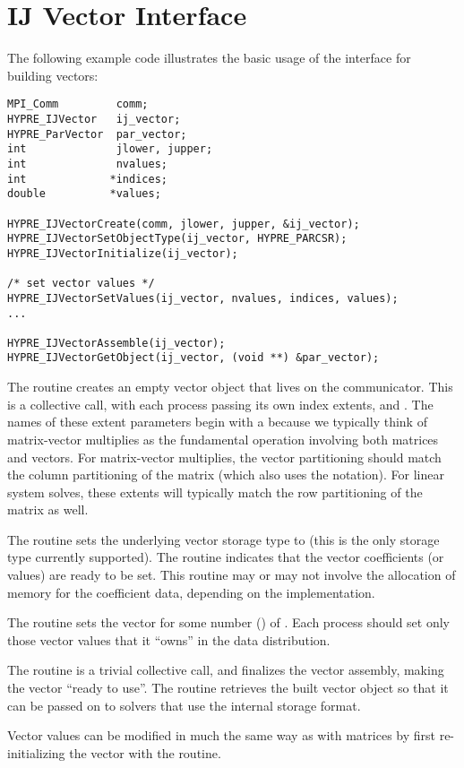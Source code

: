 
\section{IJ Vector Interface}

The following example code illustrates the basic usage of the
 interface for building vectors:

\begin{display}
\begin{verbatim}
MPI_Comm         comm;
HYPRE_IJVector   ij_vector;
HYPRE_ParVector  par_vector;
int              jlower, jupper;
int              nvalues;
int             *indices;
double          *values;

HYPRE_IJVectorCreate(comm, jlower, jupper, &ij_vector);
HYPRE_IJVectorSetObjectType(ij_vector, HYPRE_PARCSR);
HYPRE_IJVectorInitialize(ij_vector);

/* set vector values */
HYPRE_IJVectorSetValues(ij_vector, nvalues, indices, values);
...

HYPRE_IJVectorAssemble(ij_vector);
HYPRE_IJVectorGetObject(ij_vector, (void **) &par_vector);

\end{verbatim}
\end{display}
The  routine creates an empty vector object that lives
on the  communicator.  This is a collective call, with each
process passing its own index extents,  and
.  The names of these extent parameters begin with a
 because we typically think of matrix-vector multiplies as
the fundamental operation involving both matrices and vectors.  For
matrix-vector multiplies, the vector partitioning should match the
column partitioning of the matrix (which also uses the 
notation).  For linear system solves, these extents will typically
match the row partitioning of the matrix as well.

The  routine sets the underlying vector storage
type to  (this is the only storage type currently
supported).  The  routine indicates that the vector
coefficients (or values) are ready to be set.  This routine may or may
not involve the allocation of memory for the coefficient data,
depending on the implementation.

The  routine sets the vector  for some
number () of .  Each process should set
only those vector values that it ``owns'' in the data distribution.

The  routine is a trivial collective call, and
finalizes the vector assembly, making the vector ``ready to use''.
The  routine retrieves the built vector object so
that it can be passed on to \hypre{} solvers that use the
 internal storage format.

Vector values can be modified in much the same way as with matrices by
first re-initializing the vector with the  routine.
